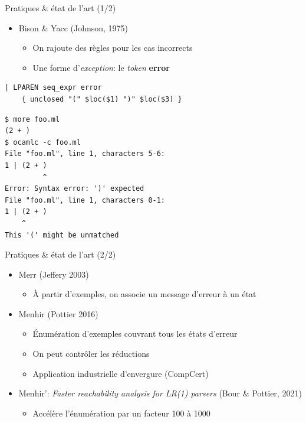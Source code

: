\documentclass{beamer}          %
\begin{document}
\begin{frame}[fragile]{Pratiques \& état de l'art (1/2)}
  \begin{itemize}
    \item Bison \& Yacc (Johnson, 1975)
      \begin{itemize}
      \item On rajoute des règles pour les cas incorrects
      \item Une forme d'{\em exception}: le {\em token} \textbf{error}
      \end{itemize}
  \end{itemize}
\pause
\small
\begin{verbatim}
| LPAREN seq_expr error
    { unclosed "(" $loc($1) ")" $loc($3) }
\end{verbatim}
\pause
\begin{verbatim}
$ more foo.ml
(2 + )
$ ocamlc -c foo.ml
File "foo.ml", line 1, characters 5-6:
1 | (2 + )
         ^
Error: Syntax error: ')' expected
File "foo.ml", line 1, characters 0-1:
1 | (2 + )
    ^
This '(' might be unmatched
\end{verbatim}
\end{frame}

\begin{frame}{Pratiques \& état de l'art (2/2)}
  \begin{itemize}
    \item Merr (Jeffery 2003)
      \begin{itemize}
        \item À partir d'exemples, on associe un message d'erreur à un état
      \end{itemize}
    \pause
    \item Menhir (Pottier 2016)
      \begin{itemize}
        \item Énumération d'exemples couvrant tous les états d'erreur
        \item On peut contrôler les réductions
        \item Application industrielle d'envergure (CompCert)
      \end{itemize}
    \pause
    \item Menhir': {\em Faster reachability analysis for LR(1) parsers} (Bour \& Pottier, 2021)
      \begin{itemize}
        \item Accélère l'énumération par un facteur 100 à 1000
      \end{itemize}
  \end{itemize}
\end{frame}
\end{document}
